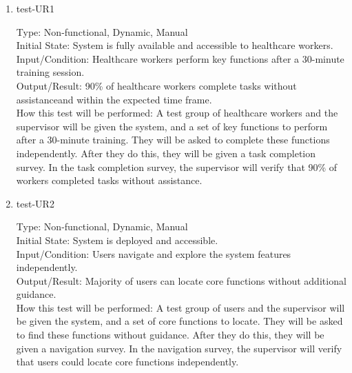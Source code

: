 \documentclass[12pt, titlepage]{article}
\begin{document}
\begin{enumerate}
    \item{test-UR1\\} \label{test-UR1}
    
    Type: Non-functional, Dynamic, Manual\\
    
    Initial State: System is fully available and accessible to healthcare workers.\\
    
    Input/Condition: Healthcare workers perform key functions after a 30-minute training session.\\
    
    Output/Result: 90\% of healthcare workers complete tasks without assistanceand within the expected time frame.\\
    
    How this test will be performed: A test group of healthcare workers and the supervisor will be given the system, and a set of key functions to perform after a 30-minute training. They will be asked to complete these functions independently. After they do this, they will be given a task completion survey. In the task completion survey, the supervisor will verify that 90\% of workers completed tasks without assistance.

    \item{test-UR2\\} \label{test-UR2}
    
    Type: Non-functional, Dynamic, Manual\\
    
    Initial State: System is deployed and accessible.\\
    
    Input/Condition: Users navigate and explore the system features independently.\\
    
    Output/Result: Majority of users can locate core functions without additional guidance.\\
    
    How this test will be performed: A test group of users and the supervisor will be given the system, and a set of core functions to locate. They will be asked to find these functions without guidance. After they do this, they will be given a navigation survey. In the navigation survey, the supervisor will verify that users could locate core functions independently.
\end{enumerate}
\end{document}

